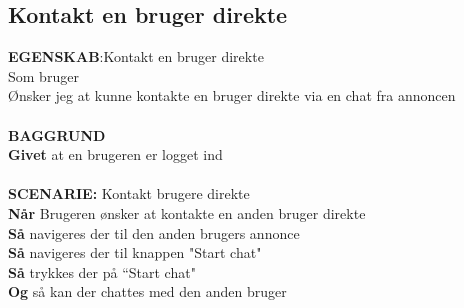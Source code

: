 \subsection{Kontakt en bruger direkte}
{\color{blue}\textbf{EGENSKAB}:}Kontakt en bruger direkte \\
Som bruger \\
Ønsker jeg at kunne kontakte en bruger direkte via en chat fra annoncen \\ \\
{\color{blue}\textbf{BAGGRUND}} \\
{\color{blue}\textbf{Givet}} at en brugeren er logget ind
 \\ \\
{\color{blue}\textbf{SCENARIE:}} Kontakt brugere direkte\\
{\color{blue}\textbf{Når}} Brugeren ønsker at kontakte en anden bruger direkte \\
{\color{blue}\textbf{Så}} navigeres der til den anden brugers annonce  \\
{\color{blue}\textbf{Så}} navigeres der til knappen "Start chat" \\
{\color{blue}\textbf{Så}} trykkes der på “Start chat" \\
{\color{blue}\textbf{Og}} så kan der chattes med den anden bruger \\ 